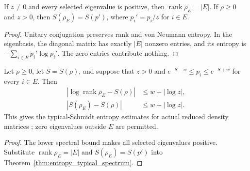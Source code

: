 \begin{theorem}
\label{thm:entropy_typical_density_spectrum}
\leanok
{}
If $z\ne0$ and every selected eigenvalue is positive, then
$\operatorname{rank}\rho_E=|E|$. If $\rho\ge0$ and $z>0$, then
$S(\rho_E)=S(p')$, where $p_i'=p_i/z$ for $i\in E$.
\end{theorem}
\begin{proof}
\leanok
Unitary conjugation preserves rank and von Neumann entropy. In the eigenbasis,
the diagonal matrix has exactly $|E|$ nonzero entries, and its entropy is
$-\sum_{i\in E}p_i'\log p_i'$. The zero entries contribute nothing.
\end{proof}

\begin{theorem}
\label{thm:entropy_typical_density_bounds}
\leanok
{}
Let $\rho\ge0$, let $S=S(\rho)$, and suppose that $z>0$ and
$e^{-S-w}\le p_i\le e^{-S+w}$ for every $i\in E$. Then
\begin{align}
 |\log\operatorname{rank}\rho_E-S(\rho)|&\le w+|\log z|,
 \label{eq:entropy_typical_rank_bound}\\
 |S(\rho_E)-S(\rho)|&\le w+|\log z|.
 \label{eq:entropy_typical_density_bound}
\end{align}
This gives the typical-Schmidt entropy estimates for actual reduced density
matrices \cite[Section~8]{OpenAI2026AreaLaw}; zero eigenvalues outside $E$ are
permitted.
\end{theorem}
\begin{proof}
\leanok
{}
The lower spectral bound makes all selected eigenvalues positive. Substitute
$\operatorname{rank}\rho_E=|E|$ and $S(\rho_E)=S(p')$ into
Theorem~\ref{thm:entropy_typical_spectrum}.
\end{proof}
